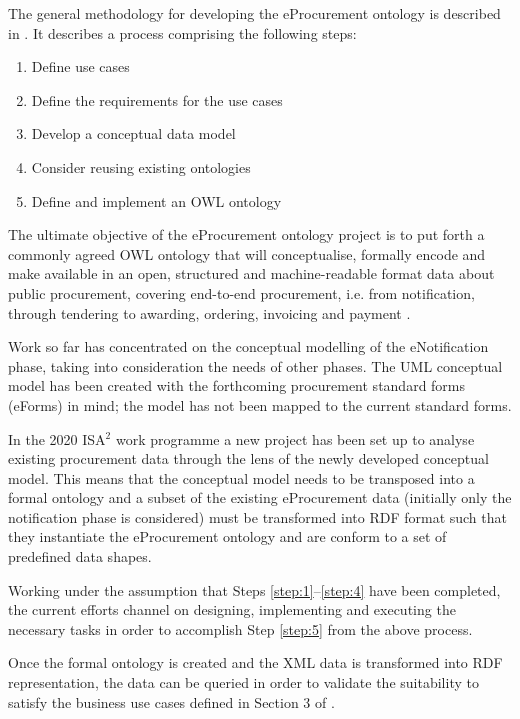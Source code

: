 	
	The general methodology for developing the eProcurement ontology is described in \cite[3--15]{d2.01-2017}. It describes a process comprising the following steps:
	\begin{enumerate}
		\item\label{step:1} Define use cases
		\item\label{step:2} Define the requirements for the use cases
		\item\label{step:3} Develop a conceptual data model
		\item\label{step:4} Consider reusing existing ontologies
		\item\label{step:5} Define and implement an OWL ontology		
	\end{enumerate}
	
	The ultimate objective of the eProcurement ontology project is to put forth a commonly agreed OWL ontology that will conceptualise, formally encode and make available in an open, structured and machine-readable format data about public procurement, covering end-to-end procurement, i.e. from notification, through tendering to awarding, ordering, invoicing and payment \citep{d4.07-2016}.
	
	Work so far has concentrated on the conceptual modelling of the eNotification phase, taking into consideration the needs of other phases. The UML conceptual model has been created with the forthcoming procurement standard forms (eForms) in mind; the model has not been mapped to the current standard forms.
	
	In the 2020 ISA$^2$ work programme a new project has been set up to analyse existing procurement data through the lens of the newly developed conceptual model. This means that the conceptual model needs to be transposed into a formal ontology and a subset of the existing eProcurement data (initially only the notification phase is considered) must be transformed into RDF format such that they instantiate the eProcurement ontology and are conform to a set of predefined data shapes.
	
	Working under the assumption that Steps \ref{step:1}--\ref{step:4} have been completed, the current efforts channel on designing, implementing and executing the necessary tasks in order to accomplish Step \ref{step:5} from the above process. 
	
	Once the formal ontology is created and the XML data is transformed into RDF representation, the data can be queried in order to validate the suitability to satisfy the business use cases defined in Section 3 of \cite{d2.01-2017}.
	
